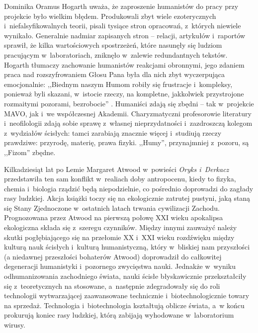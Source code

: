\begin{artplenv}{Dominika Oramus}
Hogarth uważa, że zaproszenie humanistów do pracy przy projekcie było wielkim błędem. Produkowali zbyt wiele ezoterycznych i~niefalsyfikowalnych teorii, pisali tysiące stron opracowań, z~których niewiele wynikało. Generalnie nadmiar zapisanych stron -- relacji, artykułów i~raportów sprawił, że kilka wartościowych spostrzeżeń, które nasunęły się ludziom pracującym w~laboratoriach, zniknęło w~zalewie redundantnych tekstów. Hogarth tłumaczy zachowanie humanistów reakcjami obronnymi, jego zdaniem praca nad rozszyfrowaniem Głosu Pana była dla nich zbyt wyczerpująca emocjonalnie: ,,Biednym naszym Humom robiły się frustracje i~kompleksy, ponieważ byli skazani, w~istocie rzeczy, na kompletne, jakkolwiek przystrojone rozmaitymi pozorami, bezrobocie''
\parencite[][s.~85]{lem_glos_2002}. %
 Humaniści zdają się zbędni -- tak w~projekcie MAVO, jak i~we współczesnej Akademii. Charyzmatyczni profesorowie literatury i~neofilologii zdają sobie sprawę z~własnej nieprzydatności i~zazdroszczą kolegom z~wydziałów ścisłych: tamci zarabiają znacznie więcej i~studiują rzeczy prawdziwe: przyrodę, materię, prawa fizyki. ,,Humy'', przynajmniej z~pozoru, są ,,Fizom'' zbędne.

Kilkadziesiąt lat po Lemie Margaret Atwood w~powieści \textit{Oryks i~Derkacz}
\parencite*[][]{atwood_oryks_2004} %
 przedstawiła ten sam konflikt w~realiach doby antropocenu, kiedy to fizyka, chemia i~biologia rządzić będą niepodzielnie, co pośrednio doprowadzi do zagłady rasy ludzkiej. Akcja książki toczy się na ekologicznie zatrutej pustyni, jaką staną się Stany Zjednoczone w~ostatnich latach trwania cywilizacji Zachodu. Prognozowana przez Atwood na pierwszą połowę XXI wieku apokalipsa ekologiczna składa się z~szeregu czynników. Między innymi zauważyć należy skutki pogłębiającego się na przełomie XX i~XXI wieku rozdźwięku między kulturą nauk ścisłych i~kulturą humanistyczną, który w~bliskiej nam przyszłości (a niedawnej przeszłości bohaterów Atwood) doprowadził do całkowitej degeneracji humanistyki i~pozornego zwycięstwa nauki. Jednakże w~wyniku odhumanizowania zachodniego świata, nauki ścisłe błyskawicznie przekształciły się z~teoretycznych na stosowane, a~następnie zdegradowały się do roli technologii wytwarzającej zaawansowane technicznie i~biotechnologicznie towary na sprzedaż. Technologia i~biotechnologia kształtują oblicze świata, a~w końcu prokurują koniec rasy ludzkiej, którą zabijają wyhodowane w~laboratorium wirusy.


\end{artplenv}
